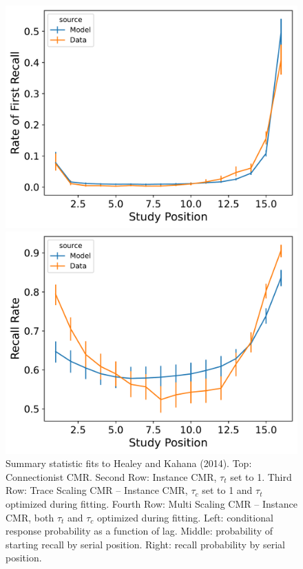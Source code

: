 \documentclass[
  letterpaper,
  11pt,
  english,
  singlespacing,
  headsepline]{MastersDoctoralThesis}
\begin{document}
\begin{figure}
\begin{minipage}{0.33\linewidth}
\includegraphics{icmr_figures/HealyKahana2014_MultiScalingCMR_Model_Fitting_pfr-1.png}\end{minipage}%
%
\begin{minipage}{0.33\linewidth}
\includegraphics{icmr_figures/HealyKahana2014_MultiScalingCMR_Model_Fitting_spc-1.png}\end{minipage}%

\caption{\label{fig-healey2014memory}Summary statistic fits to Healey
and Kahana (2014). Top: Connectionist CMR. Second Row: Instance CMR,
\(\tau_{t}\) set to 1. Third Row: Trace Scaling CMR -- Instance CMR,
\(\tau_{c}\) set to 1 and \(\tau_{t}\) optimized during fitting. Fourth
Row: Multi Scaling CMR -- Instance CMR, both \(\tau_{t}\) and
\(\tau_{c}\) optimized during fitting. Left: conditional response
probability as a function of lag. Middle: probability of starting recall
by serial position. Right: recall probability by serial position.}

\end{figure}%
\end{document}
